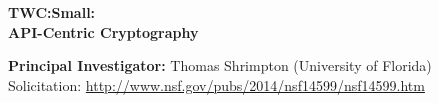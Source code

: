 \documentclass[10pt]{article}
\newcommand{\mytitle}{TWC:Small:\\
  \smallskip API-Centric Cryptography}
\begin{document}
\vspace*{1.0in}
\begin{center}

{\Large\bf \mytitle}

\vspace*{.5in}

\medskip
\noindent\textbf{Principal Investigator:} Thomas Shrimpton (University of Florida)\\


\medskip
Solicitation: \url{http://www.nsf.gov/pubs/2014/nsf14599/nsf14599.htm}

\end{center}
\thispagestyle{empty}

\iffalse

\clearpage
\setcounter{page}{1}


\fi

\clearpage
\renewcommand{\thepage}{D-\arabic{page}}
\setcounter{page}{1}



%

%

%

%

%






%

\clearpage
\renewcommand{\thepage}{M-\arabic{page}}
\setcounter{page}{1}

\end{document}
